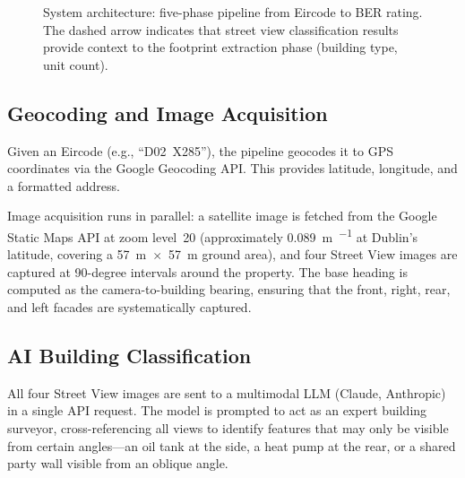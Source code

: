 \documentclass[preprint,12pt,authoryear]{elsarticle}
\begin{document}
\begin{figure}[htbp]
\caption{System architecture: five-phase pipeline from Eircode to BER rating. The dashed arrow indicates that street view classification results provide context to the footprint extraction phase (building type, unit count).}
\label{fig:pipeline}
\end{figure}

\subsection{Geocoding and Image Acquisition}

Given an Eircode (e.g., ``D02~X285''), the pipeline geocodes it to GPS coordinates via the Google Geocoding API. This provides latitude, longitude, and a formatted address.

Image acquisition runs in parallel: a satellite image is fetched from the Google Static Maps API at zoom level~20 (approximately \SI{0.089}{\metre\per\pixel} at Dublin's latitude, covering a \SI{57}{\metre}~$\times$~\SI{57}{\metre} ground area), and four Street View images are captured at 90-degree intervals around the property. The base heading is computed as the camera-to-building bearing, ensuring that the front, right, rear, and left facades are systematically captured.

\subsection{AI Building Classification}

All four Street View images are sent to a multimodal LLM (Claude, Anthropic) in a single API request. The model is prompted to act as an expert building surveyor, cross-referencing all views to identify features that may only be visible from certain angles---an oil tank at the side, a heat pump at the rear, or a shared party wall visible from an oblique angle.
\end{document}
